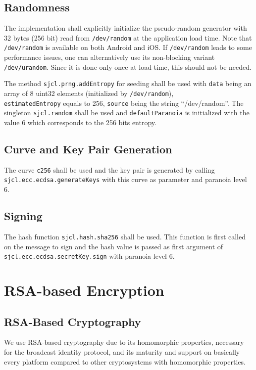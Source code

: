 \documentclass[a4paper,10pt]{article}
\begin{document}
\subsection{Randomness}
The implementation shall explicitly initialize the pseudo-random generator with 32 bytes (256 bit) read from \texttt{/dev/random} at the application load time. Note that 
\texttt{/dev/random} is available on both Android and iOS. If \texttt{/dev/random} leads to some performance issues, one can alternatively use its non-blocking variant 
\texttt{/dev/urandom}. Since it is done only once at load time, this should not be needed.

The method \texttt{sjcl.prng.addEntropy} for seeding shall be used with \texttt{data} being an array of 8 uint32 elements (initialized by \texttt{/dev/random}),\\ 
\texttt{estimatedEntropy} equals to 256, \texttt{source} being the string ``/dev/random''. The singleton \texttt{sjcl.random} shall be used and \texttt{defaultParanoia} is 
initialized with the value 6 which corresponds to the 256 bits entropy.

\subsection{Curve and Key Pair Generation}
The curve \texttt{c256} shall be used and the key pair is generated by calling\\\texttt{sjcl.ecc.ecdsa.generateKeys} with this curve as parameter and paranoia level 6.

\subsection{Signing}
The hash function \texttt{sjcl.hash.sha256} shall be used. This function is first called on the message to sign and the hash value is passed as first argument of 
\texttt{sjcl.ecc.ecdsa.secretKey.sign} with paranoia level 6.

\section{RSA-based Encryption}

\subsection{RSA-Based Cryptography}
We use RSA-based cryptography due to its homomorphic properties, necessary for the broadcast identity protocol, and its maturity and support on basically every platform compared 
to other cryptosystems with homomorphic properties. 
\end{document}
